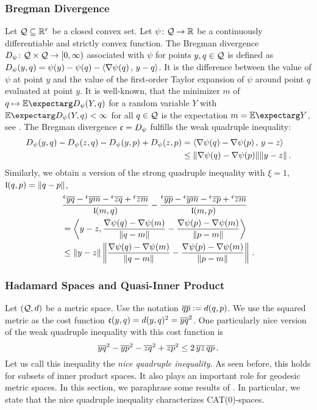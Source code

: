 \subsubsection{Bregman Divergence}
%
Let $\mathcal{Q}\subseteq \mathbb{R}^r$ be a closed convex set. Let $\psi\colon\mathcal{Q}\to \mathbb{R}$ be a continuously differentiable and strictly convex function. The Bregman divergence $D_\psi \colon \mathcal{Q} \times \mathcal{Q} \to [0,\infty)$ associated with $\psi$ for points $y, q \in \mathcal{Q}$ is defined as $D_\psi(y,q) = \psi(y)-\psi(q)-\left\langle\nabla \psi(q)\,,\, y-q\right\rangle$. It is the difference between the value of $\psi$ at point $y$ and the value of the first-order Taylor expansion of $\psi$ around point $q$ evaluated at point $y$. It is well-known, that the minimizer $m$ of $q \mapsto\Ex{D_\psi(Y,q)}$ for a random variable $Y$ with $\Ex{D_\psi(Y,q)}<\infty$ for all $q\in\mathcal{Q}$ is the expectation $m = \Ex{Y}$, see \cite[Theorem 1]{banerjee05}. The Bregman divergence $\mathfrak{c} = D_\psi$ fulfills the weak quadruple inequality:
\begin{align*}
	D_\psi(y,q) - D_\psi(z,q) - D_\psi(y,p) +D _\psi(z,p) &= \left\langle\nabla \psi(q)-\nabla \psi(p)\,,\, y-z\right\rangle \\&\leq \Vert \nabla \psi(q)-\nabla \psi(p) \Vert\Vert y-z \Vert
	\, .
\end{align*} 
Similarly, we obtain a version of the strong quadruple inequality with  $\xi=1$, $\mathfrak{l}(q,p) = \Vert q-p \Vert$, 
\begin{align*}
	&\frac{\olc yq- \olc ym- \olc zq + \olc zm}{\mf l(m,q)} - \frac{\olc yp- \olc ym- \olc zp + \olc zm}{\mf l(m,p)}
	\\&=
	\left\langle y-z, \frac{\nabla \psi(q)-\nabla \psi(m)}{\normof{q-m}}-\frac{\nabla \psi(p)-\nabla \psi(m)}{\normof{p-m}} \right\rangle
	\\&\leq
	\normof{y-z} \normOf{\frac{\nabla \psi(q)-\nabla \psi(m)}{\normof{q-m}}-\frac{\nabla \psi(p)-\nabla \psi(m)}{\normof{p-m}}}
	\eqfs
\end{align*}
%
%
%
\subsubsection{Hadamard Spaces and Quasi-Inner Product}\label{ssse:quad:npc}
%
Let $(\mathcal{Q}, d)$ be a metric space. Use the notation $\overline{qp} := d(q,p)$. We use the squared metric as the cost function $\mathfrak{c}(y,q) = d(y,q)^2 = \overline{yq}^2$.
One particularly nice version of the weak quadruple inequality with this cost function is
\begin{equation*}
	\overline{yq}^2 - \overline{yp}^2 - \overline{zq}^2 + \overline{zp}^2 \leq 2 \,\overline{yz}\, \overline{qp}
	\, .
\end{equation*}
Let us call this inequality the \textit{nice quadruple inequality}.
As seen before, this holds for subsets of inner product spaces. It also plays an important role for geodesic metric spaces.
In this section, we paraphrase some results of \cite{berg08}. In particular, we state that the nice quadruple inequality characterizes CAT(0)-spaces.

